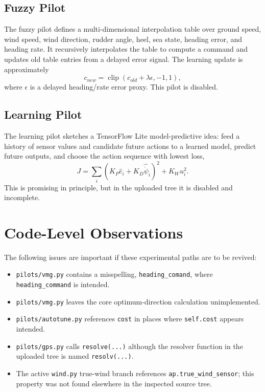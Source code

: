 \documentclass[10pt,twocolumn]{article}
\newcommand{\clip}{\operatorname{clip}}
\newcommand{\heading}{\psi}
\begin{document}
\subsection{Fuzzy Pilot}

The fuzzy pilot defines a multi-dimensional interpolation table over ground speed, wind
speed, wind direction, rudder angle, heel, sea state, heading error, and heading rate.
It recursively interpolates the table to compute a command and updates old table entries
from a delayed error signal.  The learning update is approximately
\begin{equation}
  c_{new} = \clip(c_{old} + \lambda\epsilon, -1, 1),
\end{equation}
where \(\epsilon\) is a delayed heading/rate error proxy.  This pilot is disabled.

\subsection{Learning Pilot}

The learning pilot sketches a TensorFlow Lite model-predictive idea: feed a history of
sensor values and candidate future actions to a learned model, predict future outputs, and
choose the action sequence with lowest loss,
\begin{equation}
  J = \sum_i
  \left(K_P \hat e_i + K_D\widehat{\dot{\heading}}_i\right)^2
  + K_W u_i^2.
\end{equation}
This is promising in principle, but in the uploaded tree it is disabled and incomplete.

\section{Code-Level Observations}

The following issues are important if these experimental paths are to be revived:
\begin{itemize}
\item \texttt{pilots/vmg.py} contains a misspelling, \texttt{heading\_comand}, where
\texttt{heading\_command} is intended.
\item \texttt{pilots/vmg.py} leaves the core optimum-direction calculation unimplemented.
\item \texttt{pilots/autotune.py} references \texttt{cost} in places where
\texttt{self.cost} appears intended.
\item \texttt{pilots/gps.py} calls \texttt{resolve(...)} although the resolver function
in the uploaded tree is named \texttt{resolv(...)}.
\item The active \texttt{wind.py} true-wind branch references \texttt{ap.true\_wind\_sensor};
this property was not found elsewhere in the inspected source tree.
\end{itemize}
\end{document}
